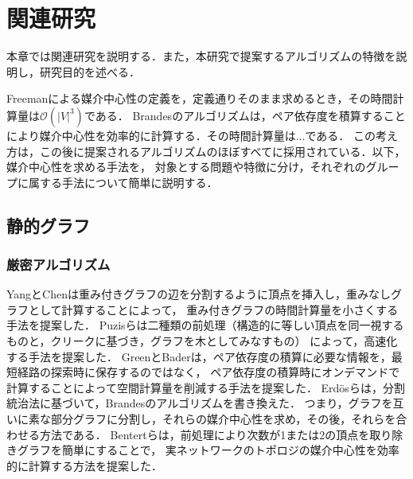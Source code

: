 
\chapter{関連研究}
\label{chap:related-work}

本章では関連研究を説明する．また，本研究で提案するアルゴリズムの特徴を説明し，研究目的を述べる．

Freemanによる媒介中心性の定義を，定義通りそのまま求めるとき，その時間計算量は$\mathcal{O}(|V|^3)$である．
Brandesのアルゴリズム\cite{Brandes2001}は，ペア依存度を積算することにより媒介中心性を効率的に計算する．その時間計算量は...である．
この考え方は，この後に提案されるアルゴリズムのほぼすべてに採用されている．以下，媒介中心性を求める手法を，
対象とする問題や特徴に分け，それぞれのグループに属する手法について簡単に説明する．

\section{静的グラフ}

\subsection{厳密アルゴリズム}
YangとChen\cite{Yang2011}は重み付きグラフの辺を分割するように頂点を挿入し，重みなしグラフとして計算することによって，
重み付きグラフの時間計算量を小さくする手法を提案した．
Puzisら\cite{Puzis2012}は二種類の前処理（構造的に等しい頂点を同一視するものと，クリークに基づき，グラフを木としてみなすもの）
によって，高速化する手法を提案した．
GreenとBader\cite{Green2013}は，ペア依存度の積算に必要な情報を，最短経路の探索時に保存するのではなく，
ペア依存度の積算時にオンデマンドで計算することによって空間計算量を削減する手法を提案した．
Erd{\"{o}}sら\cite{Erdos2015}は，分割統治法に基づいて，Brandesのアルゴリズムを書き換えた．
つまり，グラフを互いに素な部分グラフに分割し，それらの媒介中心性を求め，その後，それらを合わせる方法である．
Bentertら\cite{Bentert2018}は，前処理により次数が1または2の頂点を取り除きグラフを簡単にすることで，
実ネットワークのトポロジの媒介中心性を効率的に計算する方法を提案した．

